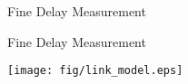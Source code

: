 \documentclass[compress,red]{beamer}
\begin{document}
% 
% 
% 
\logo{}
\begin{frame}{Fine Delay Measurement}


\end{frame}
\begin{frame}{Fine Delay Measurement}

  \begin{center}
  \texttt{[image: fig/link\_model.eps]}
  \end{center}

\end{frame}
\end{document}
